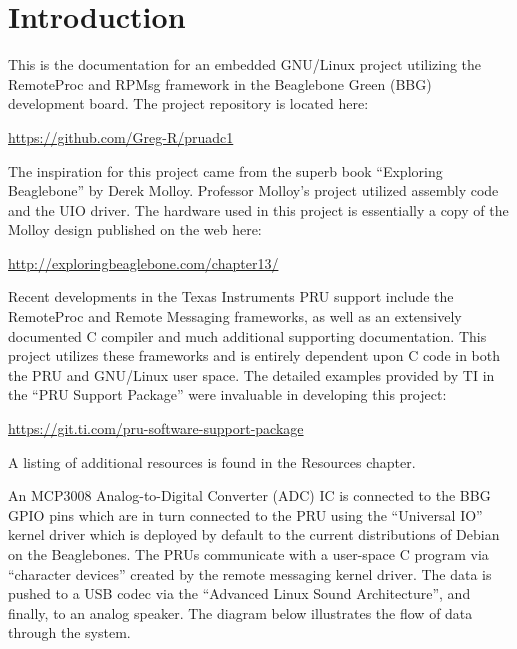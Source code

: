 %
%
%

\chapter{Introduction}

This is the documentation for an embedded GNU/Linux project utilizing the RemoteProc and RPMsg framework in the Beaglebone Green (BBG) development board.  The project repository is located here:

\url{https://github.com/Greg-R/pruadc1}

The inspiration for this project came from the superb book ``Exploring Beaglebone'' by Derek Molloy.  Professor Molloy's project utilized assembly code and the UIO driver.  The hardware used in this project is essentially a copy of the Molloy design published on the web here:

\url{http://exploringbeaglebone.com/chapter13/}

Recent developments in the Texas Instruments PRU support include the RemoteProc and Remote Messaging frameworks, as well as an extensively documented C compiler and much additional supporting documentation.  This project utilizes these frameworks and is entirely dependent upon C code in both the PRU and GNU/Linux user space.  The detailed examples provided by TI in the ``PRU Support Package'' were invaluable in developing this project:

\url{https://git.ti.com/pru-software-support-package}

A listing of additional resources is found in the Resources chapter.

An MCP3008 Analog-to-Digital Converter (ADC) IC is connected to the BBG GPIO pins which are in turn connected to the PRU using the ``Universal IO'' kernel driver which is deployed by default to the current distributions of Debian on the Beaglebones.  The PRUs communicate with a user-space C program via ``character devices'' created by the remote messaging kernel driver.  The data is pushed to a USB codec via the ``Advanced Linux Sound Architecture'', and finally, to an analog speaker.  The diagram below illustrates the flow of data through the system.


